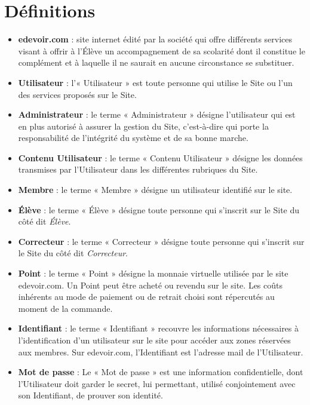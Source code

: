 \section{Définitions}

\begin{itemize}
  \item \textbf{edevoir.com} : site internet édité par la société \eDevoir qui offre différents services visant à offrir à l'Élève un accompagnement de sa scolarité dont il constitue le complément et à laquelle il ne saurait en aucune circonstance se substituer.

  \item \textbf{Utilisateur} : l'« Utilisateur » est toute personne qui utilise le Site ou l'un des services proposés sur le Site.

  \item \textbf{Administrateur} : le terme « Administrateur » désigne l'utilisateur qui est en plus autorisé à assurer la gestion du Site, c'est-à-dire qui porte la responsabilité de l'intégrité du système et de sa bonne marche.
  
  \item \textbf{Contenu Utilisateur} : le terme « Contenu Utilisateur » désigne les données transmises par l'Utilisateur dans les différentes rubriques du Site.

  \item \textbf{Membre} : le terme « Membre » désigne un utilisateur identifié sur le site.

  \item \textbf{Élève} : le terme « Élève » désigne toute personne qui s'inscrit sur le Site du côté dit \textit{Élève}.

  \item \textbf{Correcteur} : le terme « Correcteur » désigne toute personne qui s'inscrit sur le Site du côté dit \textit{Correcteur}.
  
  \item \textbf{Point} : le terme « Point » désigne la monnaie virtuelle utilisée par le site edevoir.com. Un Point peut être acheté ou revendu sur le site. Les coûts inhérents au mode de paiement ou de retrait choisi sont répercutés au moment de la commande.

  \item \textbf{Identifiant} : le terme « Identifiant » recouvre les informations nécessaires à l'identification d'un utilisateur sur le site pour accéder aux zones réservées aux membres. Sur edevoir.com, l'Identifiant est l'adresse mail de l'Utilisateur.

  \item \textbf{Mot de passe} : Le « Mot de passe » est une information confidentielle, dont l'Utilisateur doit garder le secret, lui permettant, utilisé conjointement avec son Identifiant, de prouver son identité.
\end{itemize}


